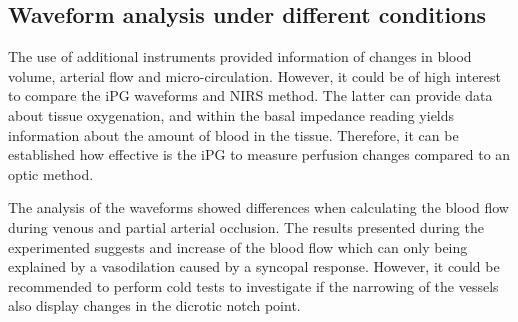 \subsection{Waveform analysis under different conditions}
The use of additional instruments provided information of changes in blood volume, arterial flow and micro-circulation. However, it could be of high interest to compare the iPG waveforms and NIRS method. The latter can provide data about tissue oxygenation, and within the basal impedance reading yields information about the amount of blood in the tissue. Therefore, it can be established how effective is the iPG to measure perfusion changes compared to an optic method.

The analysis of the waveforms showed differences when calculating the blood flow during venous and partial arterial occlusion. The results presented during the experimented suggests and increase of the blood flow which can only being explained by a vasodilation caused by a syncopal response. However, it could be recommended to perform cold tests to investigate if the narrowing of the vessels also display changes in the dicrotic notch point. 


